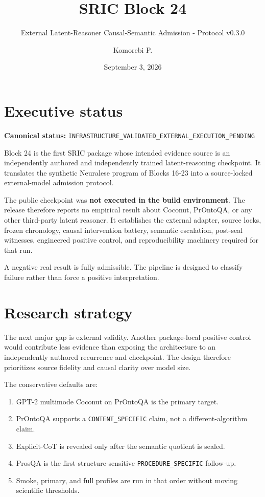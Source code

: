 \documentclass[
  10pt,
]{article}
\title{SRIC Block 24}
\subtitle{External Latent-Reasoner Causal-Semantic Admission - Protocol
v0.3.0}
\author{Komorebi P.}
\date{September 3, 2026}
\providecommand{\tightlist}{%
  \setlength{\itemsep}{0pt}\setlength{\parskip}{0pt}}
\begin{document}
\maketitle

{
\hypersetup{linkcolor=}
\setcounter{tocdepth}{3}
\tableofcontents
}
\section{Executive status}\label{executive-status}

\textbf{Canonical status:}
\texttt{INFRASTRUCTURE\_VALIDATED\_EXTERNAL\_EXECUTION\_PENDING}

Block 24 is the first SRIC package whose intended evidence source is an
independently authored and independently trained latent-reasoning
checkpoint. It translates the synthetic Neuralese program of Blocks
16-23 into a source-locked external-model admission protocol.

The public checkpoint was \textbf{not executed in the build
environment}. The release therefore reports no empirical result about
Coconut, PrOntoQA, or any other third-party latent reasoner. It
establishes the external adapter, source locks, frozen chronology,
causal intervention battery, semantic escalation, post-seal witnesses,
engineered positive control, and reproducibility machinery required for
that run.

A negative real result is fully admissible. The pipeline is designed to
classify failure rather than force a positive interpretation.

\section{Research strategy}\label{research-strategy}

The next major gap is external validity. Another package-local positive
control would contribute less evidence than exposing the architecture to
an independently authored recurrence and checkpoint. The design
therefore prioritizes source fidelity and causal clarity over model
size.

The conservative defaults are:

\begin{enumerate}
\def\labelenumi{\arabic{enumi}.}
\tightlist
\item
  GPT-2 multimode Coconut on PrOntoQA is the primary target.
\item
  PrOntoQA supports a \texttt{CONTENT\_SPECIFIC} claim, not a
  different-algorithm claim.
\item
  Explicit-CoT is revealed only after the semantic quotient is sealed.
\item
  ProsQA is the first structure-sensitive \texttt{PROCEDURE\_SPECIFIC}
  follow-up.
\item
  Smoke, primary, and full profiles are run in that order without moving
  scientific thresholds.
\end{enumerate}
\end{document}
